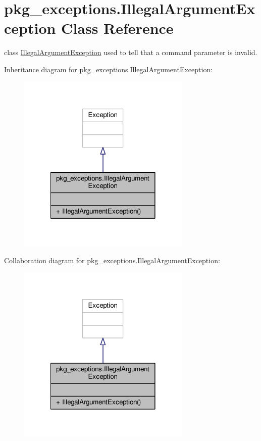 \hypertarget{classpkg__exceptions_1_1IllegalArgumentException}{\section{pkg\-\_\-exceptions.\-Illegal\-Argument\-Exception Class Reference}
\label{classpkg__exceptions_1_1IllegalArgumentException}
}


class \hyperlink{classpkg__exceptions_1_1IllegalArgumentException}{Illegal\-Argument\-Exception} used to tell that a command parameter is invalid.  




Inheritance diagram for pkg\-\_\-exceptions.\-Illegal\-Argument\-Exception\-:
\nopagebreak
\begin{figure}[H]
\begin{center}
\leavevmode
\includegraphics[width=234pt]{classpkg__exceptions_1_1IllegalArgumentException__inherit__graph}
\end{center}
\end{figure}


Collaboration diagram for pkg\-\_\-exceptions.\-Illegal\-Argument\-Exception\-:
\nopagebreak
\begin{figure}[H]
\begin{center}
\leavevmode
\includegraphics[width=234pt]{classpkg__exceptions_1_1IllegalArgumentException__coll__graph}
\end{center}
\end{figure}
